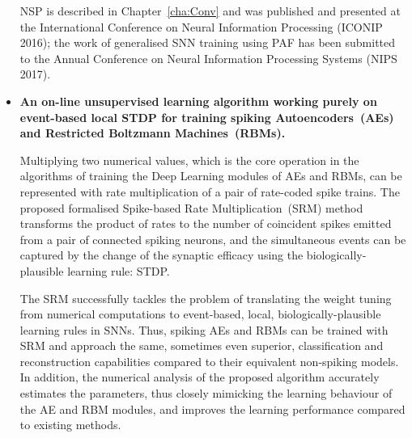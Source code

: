 \begin{itemize}

	NSP is described in Chapter~\ref{cha:Conv} and was published and presented at the International Conference on Neural Information Processing (ICONIP 2016);
	the work of generalised SNN training using PAF has been submitted to the Annual Conference on Neural Information Processing Systems (NIPS 2017).

	\item 
	\textbf{An on-line unsupervised learning algorithm working purely on event-based local STDP for training spiking Autoencoders~(AEs) and Restricted Boltzmann Machines~(RBMs).}
	
	Multiplying two numerical values, which is the core operation in the algorithms of training the Deep Learning modules of AEs and RBMs, can be represented with rate multiplication of a pair of rate-coded spike trains.
	The proposed formalised Spike-based Rate Multiplication~(SRM) method transforms the product of rates to the number of coincident spikes emitted from a pair of connected spiking neurons, and the simultaneous events can be captured by the change of the synaptic efficacy using the biologically-plausible learning rule: STDP.
	
	The SRM successfully tackles the problem of translating the weight tuning from numerical computations to event-based, local, biologically-plausible learning rules in SNNs.
	Thus, spiking AEs and RBMs can be trained with SRM and approach the same, sometimes even superior, classification and reconstruction capabilities compared to their equivalent non-spiking models.
	In addition, the numerical analysis of the proposed algorithm accurately estimates the parameters, thus closely mimicking the learning behaviour of the AE and RBM modules, and improves the learning performance compared to existing methods.
	

\end{itemize}
